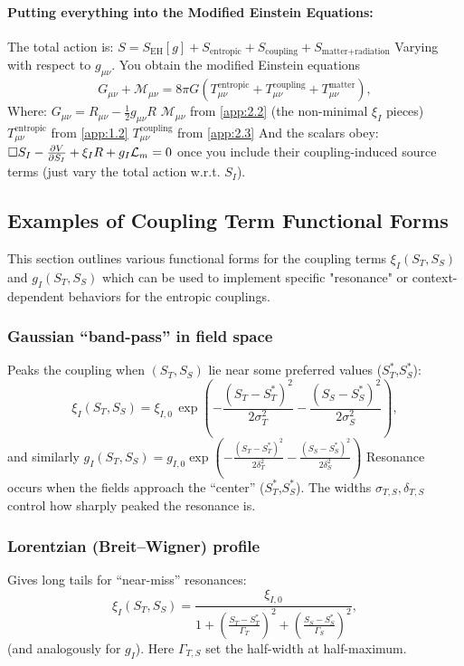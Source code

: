 \documentclass[11pt,a4paper]{article}
\newcommand{\Mmu}{\mathcal{M}}
\newcommand{\SEH}{S_\mathrm{EH}}
\newcommand{\ST}{S_T}
\newcommand{\SSp}{S_S}
\newcommand{\Scoupling}{S_{\text{coupling}}}
\newcommand{\Sentropic}{S_{\text{entropic}}}
\newcommand{\Smatterradiation}{S_{\text{matter+radiation}}}
\newcommand{\Lm}{\mathcal{L}_m}
\newcommand{\Tmnentropic}{T^{\text{entropic}}_{\mu\nu}}
\newcommand{\Tmncoupling}{T^{\text{coupling}}_{\mu\nu}}
\newcommand{\Tmnmatter}{T^{\text{matter}}_{\mu\nu}}
\begin{document}
\paragraph{Putting everything into the Modified Einstein Equations:}
The total action is:
$S=\SEH[g]+\Sentropic+\Scoupling+\Smatterradiation$
Varying with respect to $g_{\mu\nu}$. You obtain the modified Einstein equations
\begin{equation}
\label{eq:modified_Einstein_from_appendix_full}
G_{\mu\nu}+\Mmu_{\mu\nu}=8\pi G(\Tmnentropic+\Tmncoupling+\Tmnmatter),
\end{equation}
Where:
$G_{\mu\nu}=R_{\mu\nu}-\frac{1}{2}g_{\mu\nu}R$
$\Mmu_{\mu\nu}$ from \cref{app:2.2} (the non-minimal $\xi_I$ pieces)
$\Tmnentropic$ from \cref{app:1.2}
$\Tmncoupling$ from \cref{app:2.3}
And the scalars obey:
$\Box S_I-\pdv{V}{S_I}+\xi_I R+g_I\Lm=0$
once you include their coupling-induced source terms (just vary the total action w.r.t. $S_I$).

\subsection{Examples of Coupling Term Functional Forms}
\label{app:A.4}
This section outlines various functional forms for the coupling terms $\xi_I(\ST,\SSp)$ and $g_I(\ST,\SSp)$ which can be used to implement specific "resonance" or context-dependent behaviors for the entropic couplings.

\subsubsection{Gaussian “band-pass” in field space}
Peaks the coupling when $(\ST,\SSp)$ lie near some preferred values ($\ST^*$,$\SSp^*$):
\begin{equation*}
\xi_{I}(\ST,\SSp) =\xi_{I,0}\, \exp\!{\left(-\frac{(\ST-\ST^*)^2}{2\sigma_T^2}-\frac{(\SSp-\SSp^*)^2}{2\sigma_S^2}\right)},
\end{equation*}
and similarly
$g_{I}(\ST,\SSp)=g_{I,0}\exp\left(-\frac{(\ST-\ST^*)^2}{2\delta_T^2}-\frac{(\SSp-\SSp^*)^2}{2\delta_S^2}\right)$
Resonance occurs when the fields approach the ``center'' ($\ST^*$,$\SSp^*$).
The widths $\sigma_{T,S},\delta_{T,S}$ control how sharply peaked the resonance is.

\subsubsection{Lorentzian (Breit–Wigner) profile}
Gives long tails for ``near-miss'' resonances:
\begin{equation*}
\xi_I(\ST,\SSp)=\frac{\xi_{I,0}}{1+\left(\frac{\ST-\ST^*}{\Gamma_T}\right)^2+\left(\frac{\SSp-\SSp^*}{\Gamma_S}\right)^2},
\end{equation*}
(and analogously for $g_I$). Here $\Gamma_{T,S}$ set the half-width at half-maximum.
\end{document}

